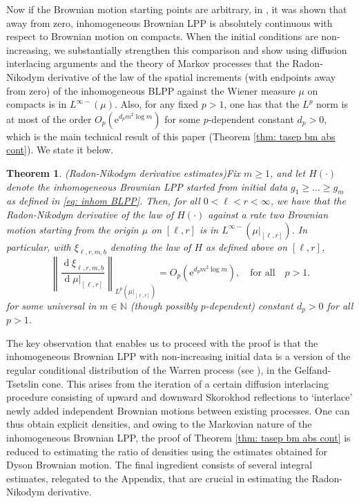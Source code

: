 \documentclass[11pt, reqno]{amsart}
\numberwithin{equation}{section}
\newcounter{dummy} \numberwithin{dummy}{section}
\newtheorem{theorem}[dummy]{Theorem}
\newcommand{\N}{\ensuremath{\mathbb{N}}}
\newcommand{\norm}[1]{\left\lVert#1\right\rVert}
\newcommand{\diff}{\ensuremath{\operatorname{d}\!}}
\begin{document}
Now if the Brownian motion starting points are arbitrary, in \cite[Theorem 4.3]{Sarkar2021Brownian}, it was shown that away from zero, inhomogeneous Brownian LPP is absolutely continuous with respect to Brownian motion on compacts. When the initial conditions are non-increasing, we substantially strengthen this comparison and show using diffusion interlacing arguments and the theory of Markov processes that the Radon-Nikodym derivative of the law of the spatial increments (with endpoints away from zero) of the inhomogeneous BLPP against the Wiener measure $\mu$ on compacts is in $L^{\infty-}(\mu)$. Also, for any fixed $p>1$, one has that the $L^p$ norm is at most of the order $O_p(\mathrm{e}^{d_pm^2\log m})$ for some $p$-dependent constant $d_p>0$, which is the main technical result of this paper (Theorem \ref{thm: tasep bm abs cont}). We state it below.


\begin{theorem}(Radon-Nikodym derivative estimates)\label{thm: main informal} Fix $m\ge 1$, and let $H(\cdot)$ denote the inhomogeneous Brownian LPP started from initial data $g_1
\ge \ldots 
\ge g_m$ as defined in \eqref{eq: inhom BLPP}. Then, for all $0<\ell<r<\infty$, we have that the Radon-Nikodym derivative
     of the law of $H(\cdot)$ against a rate two Brownian motion starting from the origin $\mu$ on $[\ell,r]$ is in $L^{\infty-}(\mu\vert_{[\ell, r]})$. In particular, with $\xi_{\ell, r, m, \underline{b}}$ denoting the law of $H$ as defined above on $[\ell, r]$,
     \begin{equation*}
         \norm{\frac{\diff \xi_{\ell, r, m, \underline{b}}}{\diff\mu\vert_{[\ell, r]}}}_{L^p(\mu\vert_{[\ell, r]})} =  O_p(\mathrm{e}^{d_pm^2\log m}),\quad \mbox{for all}\quad p>1.
     \end{equation*}
     for some universal in $m\in \N$ (though possibly $p$-dependent) constant $d_p>0$ for all $p>1$.

\end{theorem}



The key observation that enables us to proceed with the proof is that the inhomogeneous Brownian LPP with non-increasing initial data is a version of the regular conditional distribution of the Warren process  (see \cite{warren2007dyson}), in the Gelfand-Tsetslin cone. This arises from the iteration of a certain diffusion interlacing procedure consisting of upward and downward Skorokhod reflections to `interlace' newly added independent Brownian motions between existing processes. One can thus obtain explicit densities, and owing to the Markovian nature of the inhomogeneous Brownian LPP, the proof of Theorem \ref{thm: tasep bm abs cont} is reduced to estimating the ratio of densities using the estimates obtained for Dyson Brownian motion. The final ingredient consists of several integral estimates, relegated to the Appendix, that are crucial in estimating the Radon-Nikodym derivative.
\end{document}
